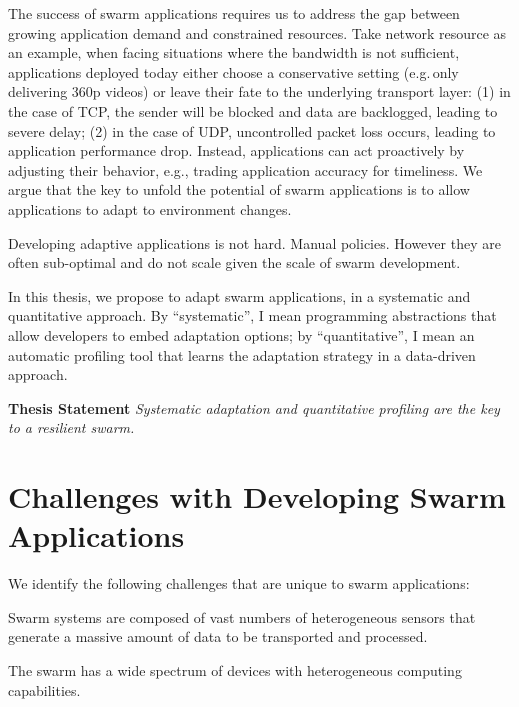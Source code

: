 \documentclass[thesis.tex]{subfiles}
\begin{document}
The success of swarm applications requires us to address the gap between growing
application demand and constrained resources. Take network resource as an
example, when facing situations where the bandwidth is not sufficient,
applications deployed today either choose a conservative setting (e.g.\,only
delivering 360p videos) or leave their fate to the underlying transport layer:
(1) in the case of TCP, the sender will be blocked and data are backlogged,
leading to severe delay; (2) in the case of UDP, uncontrolled packet loss
occurs, leading to application performance drop. Instead, applications can act
proactively by adjusting their behavior, e.g., trading application accuracy for
timeliness. We argue that the key to unfold the potential of swarm applications
is to allow applications to adapt to environment changes.

Developing adaptive applications is not hard. Manual policies. However they are
often sub-optimal and do not scale given the scale of swarm development.

In this thesis, we propose to adapt swarm applications, in a systematic and
quantitative approach. By ``systematic'', I mean programming abstractions that
allow developers to embed adaptation options; by ``quantitative'', I mean an
automatic profiling tool that learns the adaptation strategy in a data-driven
approach.

\vspace{1em}

\noindent\textbf{Thesis Statement} \newline
\textit{Systematic adaptation and quantitative profiling are the key to
  a resilient swarm.}

\vspace{1em}

\section{Challenges with Developing Swarm Applications}
\label{sec:chall-with-exist}

We identify the following challenges that are unique to swarm applications:

 Swarm systems are composed of vast numbers of
heterogeneous sensors that generate a massive amount of data to be transported
and processed.

 The swarm has a wide spectrum of devices with
heterogeneous computing capabilities.
\end{document}
